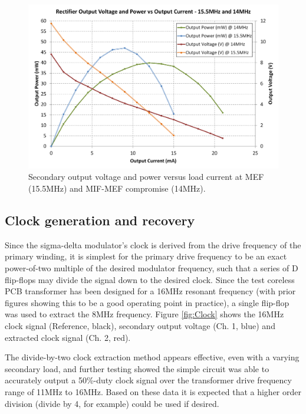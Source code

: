 \documentclass[conference]{IEEEtran}
\begin{document}
	\begin{figure}[t]
		\centering
		\includegraphics[width=1\columnwidth]{./img/VandPvsIcombined}
		\caption{Secondary output voltage and power versus load current at MEF (15.5MHz) and MIF-MEF compromise (14MHz).}
		\label{fig:VandPvsI}
	\end{figure}
	
	\subsection{Clock generation and recovery}
	Since the sigma-delta modulator's clock is derived from the drive frequency of the primary winding, it is simplest for the primary drive frequency to be an exact power-of-two multiple of the desired modulator frequency, such that a series of D flip-flops may divide the signal down to the desired clock.  Since the test coreless PCB transformer has been designed for a 16MHz resonant frequency (with prior figures showing this to be a good operating point in practice), a single flip-flop was used to extract the 8MHz frequency.  Figure \ref{fig:Clock} shows the 16MHz clock signal (Reference, black), secondary output voltage (Ch. 1, blue) and extracted clock signal (Ch. 2, red).  
	
	The divide-by-two clock extraction method appears effective, even with a varying secondary load, and further testing showed the simple circuit was able to accurately output a 50\%-duty clock signal over the transformer drive frequency range of 11MHz to 16MHz.  Based on these data it is expected that a higher order division (divide by 4, for example) could be used if desired.
	
\end{document}
